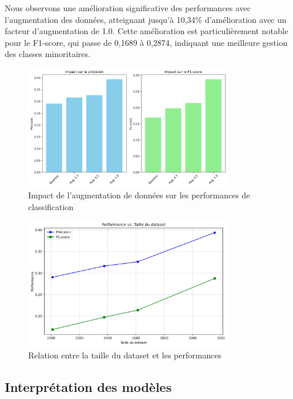 \documentclass[a4paper,11pt]{article}
\begin{document}
Nous observons une amélioration significative des performances avec l'augmentation des données, atteignant jusqu'à 10,34\% d'amélioration avec un facteur d'augmentation de 1.0. Cette amélioration est particulièrement notable pour le F1-score, qui passe de 0,1689 à 0,2874, indiquant une meilleure gestion des classes minoritaires.

\begin{figure}[ht]
    \centering
    \includegraphics[width=0.8\textwidth]{results_rapport/augmentation_impact.png}
    \caption{Impact de l'augmentation de données sur les performances de classification}
    \label{fig:augmentation-impact}
\end{figure}

\begin{figure}[ht]
    \centering
    \includegraphics[width=0.8\textwidth]{results_rapport/dataset_size_vs_performance.png}
    \caption{Relation entre la taille du dataset et les performances}
    \label{fig:dataset-size-vs-performance}
\end{figure}

\subsection{Interprétation des modèles}
\label{subsec:interpretation}
\end{document}
